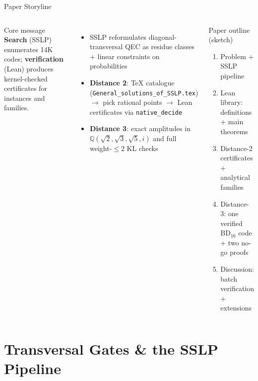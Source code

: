 \documentclass[aspectratio=169,t,10pt]{beamer}
\newcommand{\QQ}{\mathbb{Q}}
\newcommand{\code}[1]{\texttt{\small #1}}
\begin{document}
\begin{frame}{Paper Storyline}

\small
\begin{columns}[T]
\begin{block}{Core message}
\textbf{Search} (SSLP) enumerates 14K codes; \textbf{verification} (Lean) produces
kernel-checked certificates for instances and families.
\end{block}

\vspace{-0.6em}
\begin{itemize}\setlength\itemsep{0pt}
\item SSLP reformulates diagonal-transversal QEC as
  \alert{residue classes + linear constraints} on probabilities
\item \textbf{Distance 2}: TeX catalogue
  (\code{General\_solutions\_of\_SSLP.tex})
  $\to$ pick rational points $\to$ Lean certificates via \code{native\_decide}
\item \textbf{Distance 3}: exact amplitudes in
  $\QQ(\sqrt{2},\sqrt{3},\sqrt{5},i)$ and full weight-$\le 2$ KL checks
\end{itemize}

\begin{exampleblock}{Paper outline (sketch)}
\begin{enumerate}\setlength\itemsep{0pt}
\item Problem + SSLP pipeline
\item Lean library: definitions + main theorems
\item Distance-2 certificates + analytical families
\item Distance-3: one verified BD$_{16}$ code + two no-go proofs
\item Discussion: batch verification + extensions
\end{enumerate}
\end{exampleblock}
\end{columns}
\end{frame}

\section{Transversal Gates \& the SSLP Pipeline}
\end{document}
